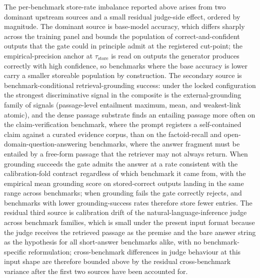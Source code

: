 The per-benchmark store-rate imbalance reported above arises from two dominant upstream sources and a small residual judge-side effect, ordered by magnitude. The dominant source is base-model accuracy, which differs sharply across the training panel and bounds the population of correct-and-confident outputs that the gate could in principle admit at the registered cut-point; the empirical-precision anchor at $\tau_{\text{store}}$ is read on outputs the generator produces correctly with high confidence, so benchmarks where the base accuracy is lower carry a smaller storeable population by construction. The secondary source is benchmark-conditional retrieval-grounding success: under the locked configuration the strongest discriminative signal in the composite is the external-grounding family of signals (passage-level entailment maximum, mean, and weakest-link atomic), and the dense passage substrate finds an entailing passage more often on the claim-verification benchmark, where the prompt registers a self-contained claim against a curated evidence corpus, than on the factoid-recall and open-domain-question-answering benchmarks, where the answer fragment must be entailed by a free-form passage that the retriever may not always return. When grounding succeeds the gate admits the answer at a rate consistent with the calibration-fold contract regardless of which benchmark it came from, with the empirical mean grounding score on stored-correct outputs landing in the same range across benchmarks; when grounding fails the gate correctly rejects, and benchmarks with lower grounding-success rates therefore store fewer entries. The residual third source is calibration drift of the natural-language-inference judge across benchmark families, which is small under the present input format because the judge receives the retrieved passage as the premise and the bare answer string as the hypothesis for all short-answer benchmarks alike, with no benchmark-specific reformulation; cross-benchmark differences in judge behaviour at this input shape are therefore bounded above by the residual cross-benchmark variance after the first two sources have been accounted for.

